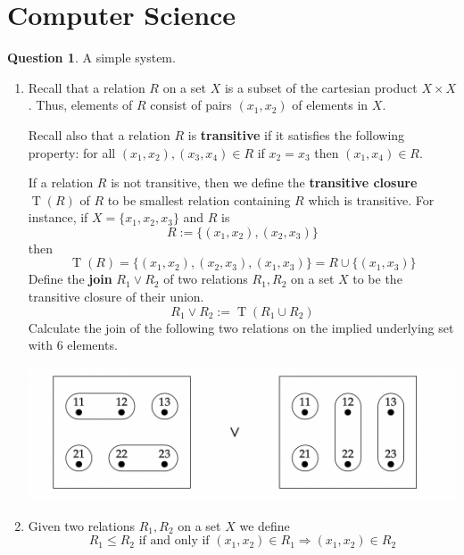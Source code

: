 \documentclass[12pt]{article}
\theoremstyle{plain}
\theoremstyle{definition}
\newtheorem{question}[thm]{Question}
\begin{document}
	\section{Computer Science}
	\begin{question}
		A simple system.
		\begin{enumerate}
			\item\label{Hasse} Recall that a relation $R$ on a set $X$ is a subset of the cartesian product $X \times X$. Thus, elements of $R$ consist of pairs $(x_1,x_2)$ of elements in $X$.
			
			Recall also that a relation $R$ is \textbf{transitive} if it satisfies the following property: for all $(x_1,x_2), (x_3, x_4) \in R$ if $x_2 = x_3$ then $(x_1, x_4) \in R$.
			
			If a relation $R$ is not transitive, then we define the \textbf{transitive closure} $\operatorname{T}(R)$ of $R$ to be smallest relation containing $R$ which is transitive. For instance, if $X = \{ x_1, x_2, x_3 \}$ and $R$ is
			\begin{equation}
				R := \{ (x_1, x_2), (x_2, x_3) \}
				\end{equation}
			then
			\begin{equation}
				\operatorname{T}(R) = \{ (x_1, x_2), (x_2, x_3), (x_1, x_3) \} = R \cup \{ (x_1, x_3) \}
				\end{equation}
			Define the \textbf{join} $R_1 \vee R_2$ of two relations $R_1, R_2$ on a set $X$ to be the transitive closure of their union.
			\begin{equation}
				R_1 \vee R_2 := \operatorname{T}(R_1 \cup R_2)
				\end{equation}
			Calculate the join of the following two relations on the implied underlying set with 6 elements.
			\begin{center}
				\includegraphics[width=\textwidth]{CompOne.png}
				\end{center}
			\item Given two relations $R_1, R_2$ on a set $X$ we define
			\begin{equation}
				R_1 \leq R_2\text{ if and only if }(x_1, x_2) \in R_1 \Longrightarrow (x_1, x_2) \in R_2

\end{equation}
\end{enumerate}
\end{question}
\end{document}
